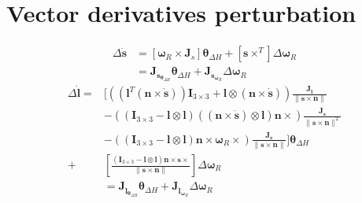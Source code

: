 \section{Vector derivatives perturbation}
\begin{equation}
    \begin{split}
        \Delta \dot{\mathbf{s}} &= \left[\boldsymbol{\omega}_R \times \mathbf{J}_s\right] \boldsymbol{\theta}_{\Delta H}  + \left[\mathbf{s} \times^T\right] \Delta \boldsymbol{\omega}_R \\
        &= \mathbf{J}_{{\dot{\mathbf{s}}}_{\boldsymbol{\theta}_{\Delta H}}} \boldsymbol{\theta}_{\Delta H} + \mathbf{J}_{{\dot{\mathbf{s}}}_{\boldsymbol{\omega}_R}} \Delta \boldsymbol{\omega}_R
    \end{split}
\end{equation}
\begin{equation}
    \begin{split}
        \Delta \dot{\mathbf{l}} = &\Bigg[
            \left(
                \left(\mathbf{l}^T \left(\mathbf{n} \times \dot{\mathbf{s}}\right)\right) \mathbf{I}_{3\times3}
                + \mathbf{l} \otimes \left(\mathbf{n} \times \dot{\mathbf{s}}\right)
            \right)
            \frac{\mathbf{J}_{\mathbf{l}}}{\|\mathbf{s} \times \mathbf{n}\|} \\
            &-
            \left(
                \left(\mathbf{I}_{3\times3} - \mathbf{l} \otimes \mathbf{l} \right)
                \left( \left( \mathbf{n} \times \dot{\mathbf{s}} \right) \otimes \mathbf{l} \right)
                \mathbf{n} \times
            \right)
            \frac{\mathbf{J}_{\mathbf{s}}}{\|\mathbf{s} \times \mathbf{n}\|^2} \\
            &-
            \left(
                \left( \mathbf{I}_{3\times3} - \mathbf{l} \otimes \mathbf{l} \right)
                \mathbf{n} \times
                \boldsymbol{\omega}_R \times
            \right)
            \frac{\mathbf{J}_{\mathbf{s}}}{\|\mathbf{s} \times \mathbf{n} \|}
        \Bigg] \boldsymbol{\theta}_{\Delta H} \\
        + &\left[\frac{\left(\mathbf{I}_{3\times3} - \mathbf{l} \otimes \mathbf{l} \right) \mathbf{n} \times \mathbf{s} \times}{\|\mathbf{s} \times \mathbf{n}\|}\right] \Delta \boldsymbol{\omega}_R\\
        &= \mathbf{J}_{{\dot{\mathbf{l}}}_{\boldsymbol{\theta}_{\Delta H}}}  \boldsymbol{\theta}_{\Delta H} + \mathbf{J}_{{\dot{\mathbf{l}}}_{\boldsymbol{\omega}_R}} \Delta \boldsymbol{\omega}_R
    \end{split}
\end{equation}
